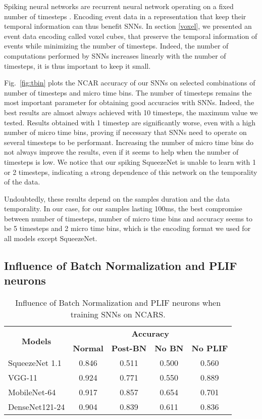 \documentclass[conference]{IEEEtran}
\begin{document}
Spiking neural networks are recurrent neural network operating on a fixed number of timesteps . Encoding event data in a representation that keep their temporal information can thus benefit SNNs. In section \ref{voxel}, we presented an event data encoding called voxel cubes, that preserve the temporal information of events while minimizing the number of timesteps. Indeed, the number of computations performed by SNNs increases linearly with the number of timesteps, it is thus important to keep it small.

Fig.~\ref{fig:tbin} plots the NCAR accuracy of our SNNs on selected combinations of number of timesteps and micro time bins. The number of timesteps remains the most important parameter for obtaining good accuracies with SNNs. Indeed, the best results are almost always achieved with 10 timesteps, the maximum value we tested. Results obtained with 1 timestep are significantly worse, even with a high number of micro time bins, proving if necessary that SNNs need to operate on several timesteps to be performant. Increasing the number of micro time bins do not always improve the results, even if it seems to help when the number of timesteps is low. We notice that our spiking SqueezeNet is unable to learn with 1 or 2 timesteps, indicating a strong dependence of this network on the temporality of the data.

Undoubtedly, these results depend on the samples duration and the data temporality. In our case, for our samples lasting 100ms, the best compromise between number of timesteps, number of micro time bins and accuracy seems to be 5 timesteps and 2 micro time bins, which is the encoding format we used for all models except SqueezeNet.


\subsection{Influence of Batch Normalization\label{bn} and PLIF neurons}

\begin{table}[]
\renewcommand{\arraystretch}{1.3}
\centering
\caption{Influence of Batch Normalization and PLIF neurons when training SNNs on NCARS.}
\begin{tabular}{lcccc}
\hline
\multicolumn{1}{c}{\multirow{2}{*}{\textbf{Models}}} & \multicolumn{4}{c}{\textbf{Accuracy }}                                                                                   \\
\multicolumn{1}{c}{}                        & \multicolumn{1}{c}{\textbf{Normal}} & \multicolumn{1}{c}{\textbf{Post-BN}} & \multicolumn{1}{c}{\textbf{No BN}} & \multicolumn{1}{c}{\textbf{No PLIF}} \\
\hline
SqueezeNet 1.1 & 0.846 & 0.511 & 0.500 & 0.560                      \\ 
VGG-11 & 0.924 & 0.771 & 0.550 & 0.889                   \\ 
MobileNet-64 & 0.917 & 0.857 & 0.654 & 0.701  \\ 
DenseNet121-24 & 0.904  & 0.839 & 0.611  & 0.836     \\ 
\hline
\end{tabular}
\label{tab:bn}
\end{table}
\end{document}
